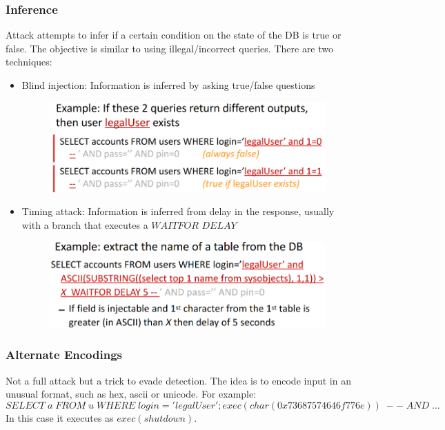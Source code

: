 \documentclass[10pt,a4paper]{report}
\begin{document}
\subsubsection{Inference}
Attack attempts to infer if a certain condition on the state of the DB is true or false. The objective is similar to using illegal/incorrect queries. There are two techniques:
\begin{itemize}
\item Blind injection: Information is inferred by asking true/false questions
\begin{figure}[H]
\centering
\includegraphics[scale=0.4]{10.png}
\end{figure}
\item Timing attack: Information is inferred from delay in the response, usually with a branch that executes a $WAITFOR$ $DELAY$
\begin{figure}[H]
\centering
\includegraphics[scale=0.4]{11.png}
\end{figure}
\end{itemize}
\subsubsection{Alternate Encodings}
Not a full attack but a trick to evade detection. The idea is to encode input in an unusual format, such as hex, ascii or unicode. For example: 
$$
SELECT \; a \; FROM \; u \; WHERE \; login='legalUser';exec(char(0x73687574646f776e))\; --\; AND\; ...
$$
In this case it executes as $exec(shutdown)$.
\end{document}
